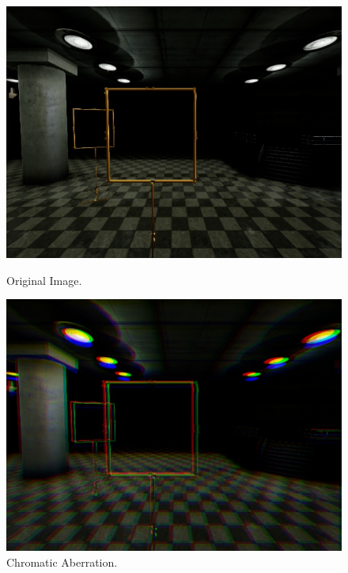 \begin{figure}[htbp]
	\centering
	\begin{minipage}{0.33\textwidth}
		\includegraphics[width=\textwidth]{fig/gate_example}
		\caption{Original Image.}
		\label{fig:orig}
	\end{minipage}
	\begin{minipage}{0.33\textwidth}
		\includegraphics[width=\textwidth]{fig/gate_example_chromatic}
		\caption{Chromatic Aberration.} 		
		\label{fig:chromatic}
	\end{minipage}
	\begin{minipage}{0.33\textwidth}

\end{minipage}
\end{figure}
